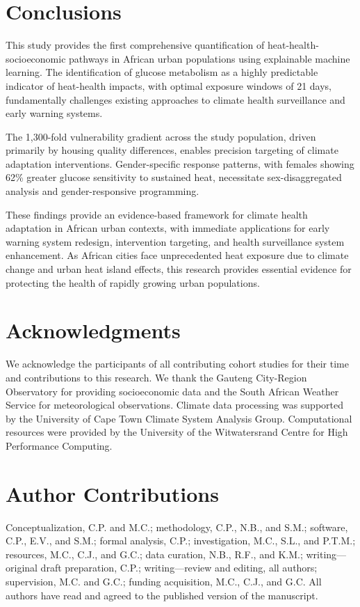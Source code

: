 \documentclass[11pt,a4paper]{article}
\begin{document}
\section{Conclusions}

This study provides the first comprehensive quantification of heat-health-socioeconomic pathways in African urban populations using explainable machine learning. The identification of glucose metabolism as a highly predictable indicator of heat-health impacts, with optimal exposure windows of 21 days, fundamentally challenges existing approaches to climate health surveillance and early warning systems.

The 1,300-fold vulnerability gradient across the study population, driven primarily by housing quality differences, enables precision targeting of climate adaptation interventions. Gender-specific response patterns, with females showing 62\% greater glucose sensitivity to sustained heat, necessitate sex-disaggregated analysis and gender-responsive programming.

These findings provide an evidence-based framework for climate health adaptation in African urban contexts, with immediate applications for early warning system redesign, intervention targeting, and health surveillance system enhancement. As African cities face unprecedented heat exposure due to climate change and urban heat island effects, this research provides essential evidence for protecting the health of rapidly growing urban populations.

\section*{Acknowledgments}

We acknowledge the participants of all contributing cohort studies for their time and contributions to this research. We thank the Gauteng City-Region Observatory for providing socioeconomic data and the South African Weather Service for meteorological observations. Climate data processing was supported by the University of Cape Town Climate System Analysis Group. Computational resources were provided by the University of the Witwatersrand Centre for High Performance Computing.

\section*{Author Contributions}

Conceptualization, C.P. and M.C.; methodology, C.P., N.B., and S.M.; software, C.P., E.V., and S.M.; formal analysis, C.P.; investigation, M.C., S.L., and P.T.M.; resources, M.C., C.J., and G.C.; data curation, N.B., R.F., and K.M.; writing—original draft preparation, C.P.; writing—review and editing, all authors; supervision, M.C. and G.C.; funding acquisition, M.C., C.J., and G.C. All authors have read and agreed to the published version of the manuscript.
\end{document}
